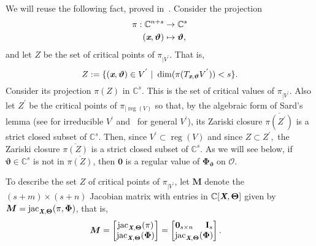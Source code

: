 \documentclass[a4paper]{article}
\def\sO{\mathscr{O}}
\def\Xb{\textit{\textbf{X}}}
\def\Thetab{\bm{\Theta}}
\def\thetab{\bm{\vartheta}}
\def\xb{\textit{\textbf{x}}}
\def\vt{\vartheta}
\DeclareMathOperator{\jac}{jac}
\DeclareMathOperator{\reg}{reg}
\def\dt{s}
\def\C{\mathbb{C}}
\def\bbm{\begin{bmatrix}}
\def\ebm{\end{bmatrix}}
\begin{document}
    We will reuse the following fact, proved in~\cite{TWT}.  Consider the
    projection 
    \begin{align*}
    \pi: \C^{n+\dt} &\rightarrow\C^{\dt} \\
    (\xb, \thetab)&\mapsto\thetab, 
    \end{align*}
    and let $Z$ be the set of critical points of
    $\pi_{|V^{'}}$. That is,  \[Z := \{(\xb,\bm \vt) \in V^{'}~|~\dim (\pi(T_{\xb,\bm \vt}V^{'}))<s\}.\] Consider its projection $\pi(Z)$ in $\C^s$. This is
    the set of critical values of $\pi_{|V^{'}}$. Also let $Z^{'}$ be the critical points of $\pi_{|\reg(V)}$ so that, by the algebraic form
    of Sard's lemma (see \cite[Theorem~3.7]{Mumford76} for irreducible $V^{'}$
    and~\cite[Proposition~B.2]{TWT} for general $V^{'}$), its Zariski closure
    $\overline{\pi(Z^{'})}$ is a strict closed subset of $\C^s$. Then, since $V^{'} \subset \reg(V)$ and since $Z \subset Z^{'},$ the Zariski closure $\overline{\pi(Z)}$ is a strict closed subset of $\C^s$.  As we will
    see below, if $\thetab \in \C^{\dt}$ is not in $\overline{\pi(Z)}$,
    then $\bm 0$ is a regular value of $\bm\Phi_{\thetab}$ on $\sO.$
    
    To describe the set $Z$ of critical points of $\pi_{|V^{'}}$, let $\bm M$
    denote the $(s+m) \times (s+n)$ Jacobian matrix with entries in
    $\C[\Xb,\Thetab]$ given by $\bm M = \jac_{\Xb,\Thetab}(\pi,\bm\Phi)$,
    that is,
    \begin{align*}
    \bm M &= 
    \bbm 
    \jac_{\Xb,\Thetab}(\pi)\\
    \jac_{\Xb,\Thetab}(\bm\Phi) 
    \ebm 
    =
    \bbm 
    \textbf{0}_{\dt \times n}\hspace{5mm}\textbf{I}_{\dt} \\
    \jac_{\Xb,\Thetab}(\bm\Phi)
    \ebm.
    \end{align*}
\end{document}
